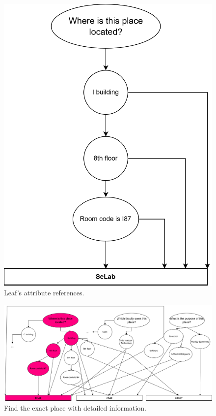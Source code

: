 \begin{figure}[ht]
  \centering
  \includegraphics[scale=0.3]{content/resources/images/chap-problems-solutions/data-management-4.png}
  \caption{Leaf's attribute references.}
  \label{fig:data-management-4}
\end{figure}

\begin{figure}[ht]
  \centering
  \includegraphics[scale=0.2]{content/resources/images/chap-problems-solutions/data-management-5.png}
  \caption{Find the exact place with detailed information.}
  \label{fig:data-management-5}
\end{figure}

